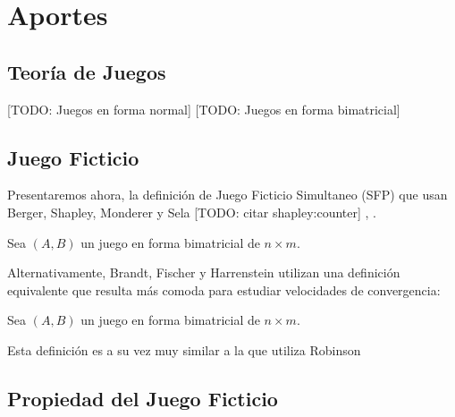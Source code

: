 \chapter{Aportes}  \label{cap1}

\section{Teoría de Juegos}
[TODO: Juegos en forma normal]
[TODO: Juegos en forma bimatricial]

\section{Juego Ficticio}
Presentaremos ahora, la definición de Juego Ficticio Simultaneo (SFP) que usan Berger, Shapley, Monderer y Sela
\cite{browns:original} \cite{strategic:complementarities} [TODO: citar shapley:counter] \cite{no:cycling}, \cite{identical:interests}.


\begin{definition}
    Sea $(A, B)$ un juego en forma bimatricial de $n \times m$.
\end{definition}

Alternativamente, Brandt, Fischer y Harrenstein utilizan una definición equivalente que resulta más comoda para estudiar velocidades
de convergencia:

\begin{definition}
    Sea $(A, B)$ un juego en forma bimatricial de $n \times m$.
\end{definition}

Esta definición es a su vez muy similar a la que utiliza Robinson \cite{robinson:zerosum}
\section{Propiedad del Juego Ficticio}